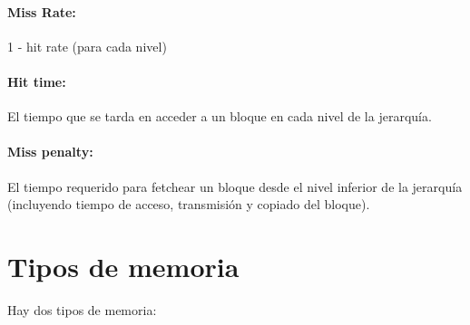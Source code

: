 \paragraph{Miss Rate: } 1 - hit rate (para cada nivel)

\paragraph{Hit time:} El tiempo que se tarda en acceder a un bloque en cada nivel de la jerarquía.

\paragraph{Miss penalty:} El tiempo requerido para fetchear un bloque desde el nivel inferior de la jerarquía (incluyendo tiempo de acceso, transmisión y copiado del bloque).

\newpage
\section{Tipos de memoria}\label{sec::Memoria::Tipos}
Hay dos tipos de memoria:


